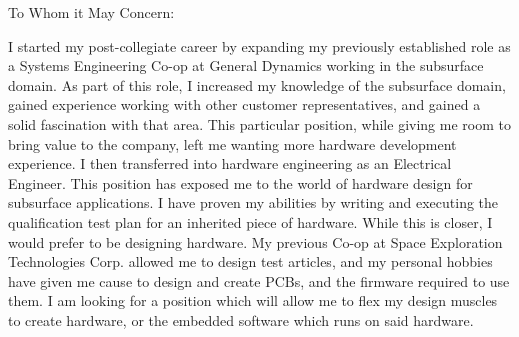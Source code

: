 \documentclass[line]{res}
\begin{document}
\setlength\columnsep{-30pt}
\address{56 South St.}
\address{Drury MA, 01343}
\website{}
 
\begin{resume}
 \setlength\multicolsep{2pt}


 
\vspace{1in}
To Whom it May Concern:
 
I started my post-collegiate career by expanding my previously established role
as a Systems Engineering Co-op at General Dynamics working in the subsurface
domain. As part of this role, I increased my knowledge of the subsurface domain,
gained experience working with other customer representatives, and gained a
solid fascination with that area. This particular position, while giving me
room to bring value to the company, left me wanting more hardware development
experience. I then transferred into hardware engineering as an Electrical
Engineer. This position has exposed me to the world of hardware design for
subsurface applications. I have proven my abilities by writing and executing
the qualification test plan for an inherited piece of hardware. While this is
closer, I would prefer to be designing hardware. My previous Co-op at
Space Exploration Technologies Corp. allowed me to design test articles, 
and my personal hobbies have given
me cause to design and create PCBs, and the firmware required to use them. 
I am looking for a position which will allow me to flex my design muscles 
to create hardware, or the embedded software which runs on said hardware. 
 

\end{resume}
\end{document}

